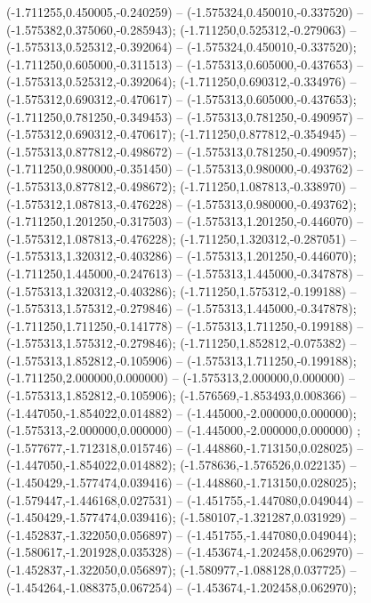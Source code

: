  (-1.711255,0.450005,-0.240259) -- (-1.575324,0.450010,-0.337520) -- (-1.575382,0.375060,-0.285943);
 (-1.711250,0.525312,-0.279063) -- (-1.575313,0.525312,-0.392064) -- (-1.575324,0.450010,-0.337520);
 (-1.711250,0.605000,-0.311513) -- (-1.575313,0.605000,-0.437653) -- (-1.575313,0.525312,-0.392064);
 (-1.711250,0.690312,-0.334976) -- (-1.575312,0.690312,-0.470617) -- (-1.575313,0.605000,-0.437653);
 (-1.711250,0.781250,-0.349453) -- (-1.575313,0.781250,-0.490957) -- (-1.575312,0.690312,-0.470617);
 (-1.711250,0.877812,-0.354945) -- (-1.575313,0.877812,-0.498672) -- (-1.575313,0.781250,-0.490957);
 (-1.711250,0.980000,-0.351450) -- (-1.575313,0.980000,-0.493762) -- (-1.575313,0.877812,-0.498672);
 (-1.711250,1.087813,-0.338970) -- (-1.575312,1.087813,-0.476228) -- (-1.575313,0.980000,-0.493762);
 (-1.711250,1.201250,-0.317503) -- (-1.575313,1.201250,-0.446070) -- (-1.575312,1.087813,-0.476228);
 (-1.711250,1.320312,-0.287051) -- (-1.575313,1.320312,-0.403286) -- (-1.575313,1.201250,-0.446070);
 (-1.711250,1.445000,-0.247613) -- (-1.575313,1.445000,-0.347878) -- (-1.575313,1.320312,-0.403286);
 (-1.711250,1.575312,-0.199188) -- (-1.575313,1.575312,-0.279846) -- (-1.575313,1.445000,-0.347878);
 (-1.711250,1.711250,-0.141778) -- (-1.575313,1.711250,-0.199188) -- (-1.575313,1.575312,-0.279846);
 (-1.711250,1.852812,-0.075382) -- (-1.575313,1.852812,-0.105906) -- (-1.575313,1.711250,-0.199188);
 (-1.711250,2.000000,0.000000) -- (-1.575313,2.000000,0.000000) -- (-1.575313,1.852812,-0.105906);
 (-1.576569,-1.853493,0.008366) -- (-1.447050,-1.854022,0.014882) -- (-1.445000,-2.000000,0.000000);
 (-1.575313,-2.000000,0.000000) -- (-1.445000,-2.000000,0.000000) ;
 (-1.577677,-1.712318,0.015746) -- (-1.448860,-1.713150,0.028025) -- (-1.447050,-1.854022,0.014882);
 (-1.578636,-1.576526,0.022135) -- (-1.450429,-1.577474,0.039416) -- (-1.448860,-1.713150,0.028025);
 (-1.579447,-1.446168,0.027531) -- (-1.451755,-1.447080,0.049044) -- (-1.450429,-1.577474,0.039416);
 (-1.580107,-1.321287,0.031929) -- (-1.452837,-1.322050,0.056897) -- (-1.451755,-1.447080,0.049044);
 (-1.580617,-1.201928,0.035328) -- (-1.453674,-1.202458,0.062970) -- (-1.452837,-1.322050,0.056897);
 (-1.580977,-1.088128,0.037725) -- (-1.454264,-1.088375,0.067254) -- (-1.453674,-1.202458,0.062970);
